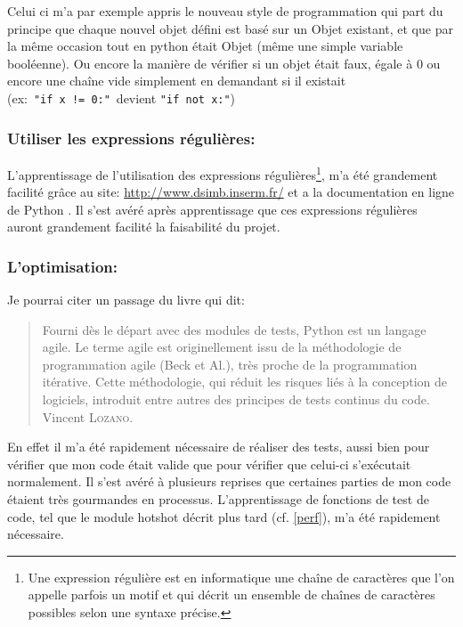 Celui ci m'a par exemple appris le nouveau style de programmation qui part du principe que chaque nouvel objet défini est basé sur un Objet existant, et que par la même occasion tout en python était Objet (même une simple variable booléenne). Ou encore la manière de vérifier si un objet était faux, égale à 0 ou encore une chaîne vide simplement en demandant si il existait (ex:~\texttt{"if~x~!=~0:"}~devient \texttt{"if~not~x:"})

        \subsubsection{Utiliser les expressions régulières:} 
L'apprentissage de l'utilisation des expressions régulières\footnote{Une expression régulière est en informatique une chaîne de caractères que l’on appelle parfois un motif et qui décrit un ensemble de chaînes de caractères possibles selon une syntaxe précise.}, m'a été grandement facilité grâce au site: \url{http://www.dsimb.inserm.fr/}\cite{re} et a la documentation en ligne de Python . Il s'est avéré après apprentissage que ces expressions régulières auront grandement facilité la faisabilité du projet.

        \subsubsection{L'optimisation:}
Je pourrai citer un passage du livre  qui dit:
\begin{quotation}
    Fourni dès le départ avec des modules de tests, Python est un langage agile. Le terme agile est originellement issu de la méthodologie de programmation agile (Beck et Al.), très proche de la programmation itérative. Cette méthodologie, qui réduit les risques liés à la conception de logiciels, introduit entre autres des principes de tests continus du code.
    \raggedleft Vincent \textsc{Lozano}.
\end{quotation}

En effet il m'a été rapidement nécessaire de réaliser des tests, aussi bien pour vérifier que mon code était valide que pour vérifier que celui-ci s’exécutait normalement. Il s'est avéré à plusieurs reprises que certaines parties de mon code étaient très gourmandes en processus. L’apprentissage de fonctions de test de code, tel que le module hotshot décrit plus tard (cf. \vref{perf}), m'a été rapidement nécessaire.

